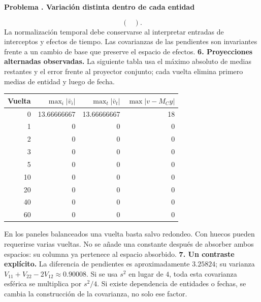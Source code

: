 \documentclass[11pt,a4paper]{article}
\theoremstyle{definition}
\newcounter{problema}
\newenvironment{resuelto}[1]{\refstepcounter{problema}\par\medskip\Needspace{6\baselineskip}\textbf{Problema \theproblema. #1}\par}{\par\medskip}
\begin{document}
\begin{resuelto}{Variación distinta dentro de cada entidad}
{\[\begin{pmatrix}
\end{pmatrix}.
\]
}
La normalización temporal debe conservarse al interpretar entradas de interceptos y efectos de tiempo. Las covarianzas de las pendientes son invariantes frente a un cambio de base que preserve el espacio de efectos.
\textbf{6. Proyecciones alternadas observadas.} La siguiente tabla usa el máximo absoluto de medias restantes y el error frente al proyector conjunto; cada vuelta elimina primero medias de entidad y luego de fecha.

\begin{center}\small
\begin{tabular}{rrrr}
\toprule
Vuelta&$\max_i|\bar v_i|$&$\max_t|\bar v_t|$&$\max|v-M_Cy|$\\
\midrule
0&13.66666667&13.66666667&18\\
1&0&0&0\\
2&0&0&0\\
3&0&0&0\\
5&0&0&0\\
10&0&0&0\\
20&0&0&0\\
40&0&0&0\\
60&0&0&0\\
\bottomrule
\end{tabular}
\end{center}
En los paneles balanceados una vuelta basta salvo redondeo. Con huecos pueden requerirse varias vueltas. No se añade una constante después de absorber ambos espacios: su columna ya pertenece al espacio absorbido.
\textbf{7. Un contraste explícito.} La diferencia de pendientes es aproximadamente $3.25824$; su varianza $V_{11}+V_{22}-2V_{12}\approx0.90008$. Si se usa $s^2$ en lugar de $4$, toda esta covarianza esférica se multiplica por $s^2/4$. Si existe dependencia de entidades o fechas, se cambia la construcción de la covarianza, no solo ese factor.
\end{resuelto}
\end{document}
